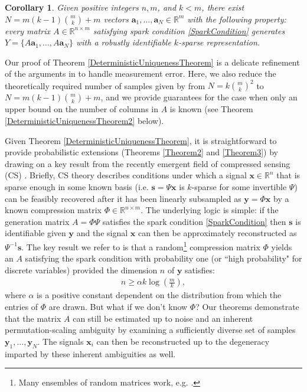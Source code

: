 \documentclass[journal, onecolumn]{IEEEtran}
\newtheorem{corollary}{Corollary}
\begin{document}
\begin{corollary}\label{DeterministicUniquenessCorollary}
Given positive integers $n, m$, and $k < m$, there exist $N =  m(k-1){m \choose k}+m$ vectors $\mathbf{a}_1, \ldots, \mathbf{a}_N \in \mathbb{R}^m$ with the following property: every matrix $A \in \mathbb{R}^{n \times m}$ satisfying spark condition \eqref{SparkCondition} generates $Y = \{A\mathbf{a}_1, \ldots, A\mathbf{a}_N\}$ with a robustly identifiable $k$-sparse representation.
\end{corollary}

Our proof of Theorem \ref{DeterministicUniquenessTheorem} is a delicate refinement of the arguments in \cite{Hillar15} to handle measurement error.  Here, we also reduce the theoretically required number of samples given by \cite{Hillar15} from $N=k{m \choose k}^2$ to $N = m(k-1){m \choose k}+m$, and we provide guarantees for the case when only an upper bound on the number of columns in $A$ is known (see Theorem \ref{DeterministicUniquenessTheorem2} below). 

Given Theorem \ref{DeterministicUniquenessTheorem}, it is straightforward to provide probabilistic extensions (Theorems \ref{Theorem2} and \ref{Theorem3}) by drawing on a key result from the recently emergent field of compressed sensing (CS) \cite{candes2006near, donoho2006compressed, candes2006stable}. 
%
%
Briefly, CS theory describes conditions under which a signal $\mathbf{x} \in \mathbb{R}^n$ that is sparse enough in some known basis (i.e. $\mathbf{s} = \Psi \mathbf{x}$ is $k$-sparse for some invertible $\Psi$) can be feasibly recovered after it has been linearly subsampled as $\mathbf{y} = \Phi \mathbf{x}$ by a known compression matrix $\Phi \in \mathbb{R}^{n \times m}$. The underlying logic is simple: if the generation matrix $A = \Phi\Psi$ satisfies the spark condition \eqref{SparkCondition} then $\mathbf{s}$ is identifiable given $\mathbf{y}$ and the signal $\mathbf{x}$ can then be approximately reconstructed as $\Psi^{-1}\mathbf{s}$. The key result we refer to is that a random\footnote{Many ensembles of random matrices work, e.g. \cite[Sec.~\S 4]{baraniuk2008simple}.} compression matrix $\Phi$ yields an $A$ satisfying the spark condition with probability one (or ``high probability" for discrete variables) provided the dimension $n$ of $\mathbf{y}$ satisfies:
\begin{align}\label{CScondition}
n \geq \alpha k\log\left(\frac{m}{k}\right),
\end{align}
where $\alpha$ is a positive constant dependent on the distribution from which the entries of $\Phi$ are drawn. 
%
%
But what if we don't know $\Phi$? Our theorems demonstrate that the matrix $A$ can still be estimated up to noise and an inherent permutation-scaling ambiguity by examining a sufficiently diverse set of samples $\mathbf{y}_1, \ldots, \mathbf{y}_N$. The signals $\mathbf{x}_i$ can then be reconstructed up to the degeneracy imparted by these inherent ambiguities as well. 
\end{document}
